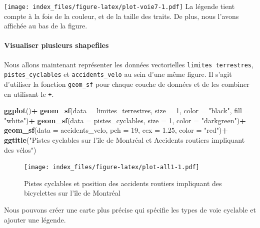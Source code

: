 \documentclass[]{article}
\newenvironment{Shaded}{\begin{snugshade}}{\end{snugshade}}
\newcommand{\KeywordTok}[1]{\textcolor[rgb]{0.13,0.29,0.53}{\textbf{#1}}}
\newcommand{\DataTypeTok}[1]{\textcolor[rgb]{0.13,0.29,0.53}{#1}}
\newcommand{\DecValTok}[1]{\textcolor[rgb]{0.00,0.00,0.81}{#1}}
\newcommand{\FloatTok}[1]{\textcolor[rgb]{0.00,0.00,0.81}{#1}}
\newcommand{\StringTok}[1]{\textcolor[rgb]{0.31,0.60,0.02}{#1}}
\newcommand{\OperatorTok}[1]{\textcolor[rgb]{0.81,0.36,0.00}{\textbf{#1}}}
\newcommand{\NormalTok}[1]{#1}
\let\oldparagraph\paragraph
\renewcommand{\paragraph}[1]{\oldparagraph{#1}\mbox{}}
\begin{document}
\texttt{[image: index\_files/figure-latex/plot-voie7-1.pdf]} La légende
tient compte à la fois de la couleur, et de la taille des traits. De
plus, nous l'avons affichée au bas de la figure.

\paragraph{Visualiser plusieurs
shapefiles}\label{visualiser-plusieurs-shapefiles}

Nous allons maintenant représenter les données vectorielles
\texttt{limites\ terrestres}, \texttt{pistes\_cyclables} et
\texttt{accidents\_velo} au sein d'une même figure. Il s'agit d'utiliser
la fonction \texttt{geom\_sf} pour chaque couche de données et de les
combiner en utilisant le \texttt{+}.

\begin{Shaded}
\begin{Highlighting}[]
\KeywordTok{ggplot}\NormalTok{()}\OperatorTok{+}
\StringTok{  }\KeywordTok{geom_sf}\NormalTok{(}\DataTypeTok{data =}\NormalTok{ limites_terrestres, }\DataTypeTok{size =} \DecValTok{1}\NormalTok{, }\DataTypeTok{color =} \StringTok{"black"}\NormalTok{, }\DataTypeTok{fill =} \StringTok{"white"}\NormalTok{)}\OperatorTok{+}
\StringTok{  }\KeywordTok{geom_sf}\NormalTok{(}\DataTypeTok{data =}\NormalTok{ pistes_cyclables, }\DataTypeTok{size =} \DecValTok{1}\NormalTok{, }\DataTypeTok{color =} \StringTok{"darkgreen"}\NormalTok{)}\OperatorTok{+}
\StringTok{  }\KeywordTok{geom_sf}\NormalTok{(}\DataTypeTok{data =}\NormalTok{ accidents_velo, }\DataTypeTok{pch =} \DecValTok{19}\NormalTok{, }\DataTypeTok{cex =} \FloatTok{1.25}\NormalTok{, }\DataTypeTok{color =} \StringTok{"red"}\NormalTok{)}\OperatorTok{+}
\StringTok{  }\KeywordTok{ggtitle}\NormalTok{(}\StringTok{"Pistes cyclables sur l'île de Montréal et Accidents routiers impliquant des vélos"}\NormalTok{)}
\end{Highlighting}
\end{Shaded}

\begin{figure}
\centering
\texttt{[image: index\_files/figure-latex/plot-all1-1.pdf]}
\caption{Pistes cyclables et position des accidents routiers impliquant
des bicyclettes sur l'île de Montréal}
\end{figure}

Nous pouvons créer une carte plus précise qui spécifie les types de voie
cyclable et ajouter une légende.
\end{document}
